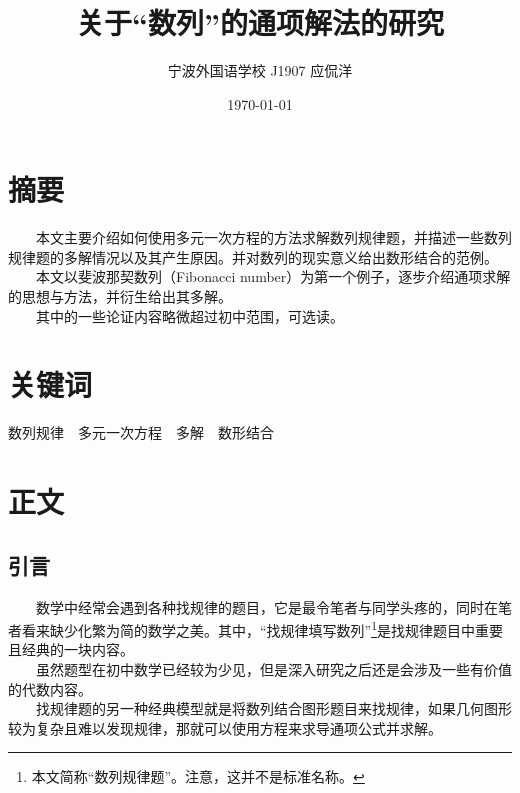 \documentclass[12pt]{article}
\title{关于“数列”的通项解法的研究}
\author{宁波外国语学校 J1907 应侃洋}
\date{\today}
\begin{document}
  \maketitle
  \newpage
  \tableofcontents
  \newpage
    \section{摘要}
      　　本文主要介绍如何使用多元一次方程的方法求解数列规律题，并描述一些数列规律题的多解情况以及其产生原因。并对数列的现实意义给出数形结合的范例。\\
      　　本文以斐波那契数列（Fibonacci number）为第一个例子，逐步介绍通项求解的思想与方法，并衍生给出其多解。\\
      　　其中的一些论证内容略微超过初中范围，可选读。
    \section{关键词}
      数列规律　多元一次方程　多解　数形结合
    \section{正文}
      \subsection{引言}
        　　数学中经常会遇到各种找规律的题目，它是最令笔者与同学头疼的，同时在笔者看来缺少化繁为简的数学之美。其中，“找规律填写数列”\footnote{本文简称“数列规律题”。注意，这并不是标准名称。}是找规律题目中重要且经典的一块内容。\\
        　　虽然题型在初中数学已经较为少见，但是深入研究之后还是会涉及一些有价值的代数内容。\\
        　　找规律题的另一种经典模型就是将数列结合图形题目来找规律，如果几何图形较为复杂且难以发现规律，那就可以使用方程来求导通项公式并求解。
\end{document}
